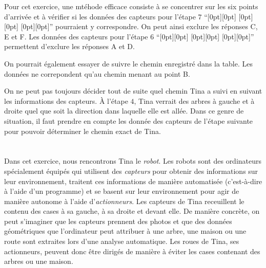 {{{\par}

Pour cet exercice, une mtéhode efficace consiste à se concentrer sur les six points d’arrivée et à vérifier si les données des capteurs pour l’étape $7$ “\raisebox{-0.5ex}[0pt][0pt]{} \raisebox{-0.5ex}[0pt][0pt]{} \raisebox{-0.5ex}[0pt][0pt]{}” pourraient y correspondre. On peut ainsi exclure les réponses C, E et F. Les données des capteurs pour l’étape $6$ “\raisebox{-0.5ex}[0pt][0pt]{} \raisebox{-0.5ex}[0pt][0pt]{} \raisebox{-0.5ex}[0pt][0pt]{}” permettent d’exclure les réponses A et D.

On pourrait également essayer de suivre le chemin enregistré dans la table. Les données ne correpondent qu’au chemin menant au point B.

On ne peut pas toujours décider tout de suite quel chemin Tina a suivi en suivant les informations des capteurs. À l’étape $4$, Tina verrait des arbres à gauche et à droite quel que soit la direction dans laquelle elle est allée. Dans ce genre de situation, il faut prendre en compte les donnée des capteurs de l’étape suivante pour pouvoir déterminer le chemin exact de Tina.

{\centering%
\par}



\section*{\BrochureItsInformatics}
Dans cet exercice, nous rencontrons Tina le \emph{robot}. Les robots sont des ordinateurs spécialement équipés qui utilisent des \emph{capteurs} pour obtenir des informations sur leur environnement, traitent ces informations de manière automatisée (c’est-à-dire à l’aide d’un programme) et se basent sur leur environnement pour agir de manière autonome à l’aide d’\emph{actionneurs}.
Les capteurs de Tina receuillent le contenu des cases à sa gauche, à sa droite et devant elle. De manière concrète, on peut s’imaginer que les capteurs prennent des photos et que des données géométriques que l’ordinateur peut attribuer à une arbre, une maison ou une route sont extraites lors d’une analyse automatique.  Les roues de Tina, ses actionneurs, peuvent donc être dirigés de manière à éviter les cases contenant des arbres ou une maison.

}}
